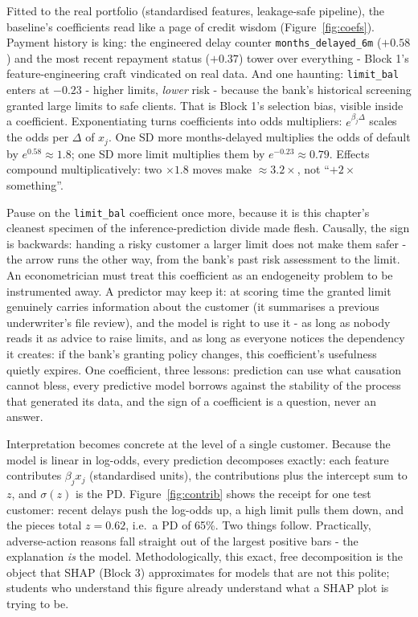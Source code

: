 \documentclass[11pt,a4paper]{article}
\begin{document}
Fitted to the real portfolio (standardised features, leakage-safe
pipeline), the baseline's coefficients read like a page of credit wisdom
(Figure~\ref{fig:coefs}). Payment history is king: the engineered delay
counter \texttt{months\_delayed\_6m} ($+0.58$) and the most recent
repayment status ($+0.37$) tower over everything - Block 1's
feature-engineering craft vindicated on real data. And one haunting:
\texttt{limit\_bal} enters at $-0.23$ - higher limits, \emph{lower} risk
- because the bank's historical screening granted large limits to safe
clients. That is Block 1's selection bias, visible inside a coefficient.
Exponentiating turns coefficients into odds multipliers:
$e^{\beta_j\Delta}$ scales the odds per $\Delta$ of $x_j$. One SD more
months-delayed multiplies the odds of default by $e^{0.58} \approx 1.8$;
one SD more limit multiplies them by $e^{-0.23} \approx 0.79$. Effects
compound multiplicatively: two $\times 1.8$ moves make $\approx
3.2\times$, not ``$+2\times$something''.

Pause on the \texttt{limit\_bal} coefficient once more, because it is
this chapter's cleanest specimen of the inference-prediction divide made
flesh. Causally, the sign is backwards: handing a risky customer a
larger limit does not make them safer - the arrow runs the other way,
from the bank's past risk assessment to the limit. An econometrician
must treat this coefficient as an endogeneity problem to be
instrumented away. A predictor may keep it: at scoring time the granted
limit genuinely carries information about the customer (it summarises a
previous underwriter's file review), and the model is right to use it -
as long as nobody reads it as advice to raise limits, and as long as
everyone notices the dependency it creates: if the bank's granting
policy changes, this coefficient's usefulness quietly expires. One
coefficient, three lessons: prediction can use what causation cannot
bless, every predictive model borrows against the stability of the
process that generated its data, and the sign of a coefficient is a
question, never an answer.

Interpretation becomes concrete at the level of a single customer.
Because the model is linear in log-odds, every prediction decomposes
exactly: each feature contributes $\beta_j x_j$ (standardised units), the
contributions plus the intercept sum to $z$, and $\sigma(z)$ is the PD.
Figure~\ref{fig:contrib} shows the receipt for one test customer: recent
delays push the log-odds up, a high limit pulls them down, and the pieces total $z = 0.62$, i.e.\
a PD of 65\%. Two things follow. Practically, adverse-action reasons fall
straight out of the largest positive bars - the explanation \emph{is}
the model. Methodologically, this exact, free decomposition is the object
that SHAP (Block 3) approximates for models that are not this polite;
students who understand this figure already understand what a SHAP plot
is trying to be.
\end{document}
